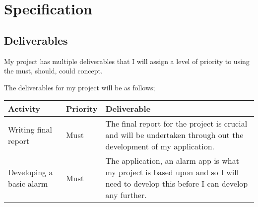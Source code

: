 \section{Specification}\label{specification}

\subsection{Deliverables}\label{deliverables}

My project has multiple deliverables that I will assign a level of
priority to using the must, should, could concept.

The deliverables for my project will be as follows;

\begin{longtable}[]{@{}lll@{}}
\toprule
\begin{minipage}[b]{0.22\columnwidth}\raggedright\strut
Activity\strut
\end{minipage} & \begin{minipage}[b]{0.10\columnwidth}\raggedright\strut
Priority\strut
\end{minipage} & \begin{minipage}[b]{0.60\columnwidth}\raggedright\strut
Deliverable\strut
\end{minipage}\tabularnewline
\midrule
\endhead
\begin{minipage}[t]{0.22\columnwidth}\raggedright\strut
Writing final report\strut
\end{minipage} & \begin{minipage}[t]{0.10\columnwidth}\raggedright\strut
Must\strut
\end{minipage} & \begin{minipage}[t]{0.60\columnwidth}\raggedright\strut
The final report for the project is crucial and will be undertaken
through out the development of my application.\strut
\end{minipage}\tabularnewline
\begin{minipage}[t]{0.22\columnwidth}\raggedright\strut
Developing a basic alarm\strut
\end{minipage} & \begin{minipage}[t]{0.10\columnwidth}\raggedright\strut
Must\strut
\end{minipage} & \begin{minipage}[t]{0.60\columnwidth}\raggedright\strut
The application, an alarm app is what my project is based upon and so I
will need to develop this before I can develop any further.\strut
\end{minipage}\tabularnewline

\end{longtable}
